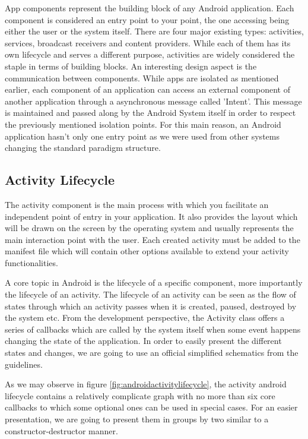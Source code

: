 App components represent the building block of any Android application. Each component is considered an entry point to your point, the one accessing being either the user or the system itself. There are four major existing types: activities, services, broadcast receivers and content providers. While each of them has its own lifecycle
and serves a different purpose, activities are widely considered the staple in terms of building blocks. An interesting design aspect is the communication between components. While apps are isolated as mentioned earlier, each component of an application can access an external component of another application through a asynchronous message called 'Intent'. This message is maintained and passed along by the Android System itself in order to respect the previously mentioned isolation points. For this main reason, an Android application hasn't only one entry point as we were used from other systems changing the standard paradigm structure.

\subsection*{Activity Lifecycle}

The activity component is the main process with which you facilitate an independent point of entry in your application. It also provides the layout which will be drawn on the screen by the operating system and usually represents the main interaction point with the user. Each created activity must be added to the manifest file which will contain other options available to extend your activity functionalities.

A core topic in Android is the lifecycle of a specific component, more importantly the lifecycle of an activity. The lifecycle of an activity can be seen as the flow of states through which an activity passes when it is created, paused, destroyed by the system etc. From the development perspective, the Activity class offers a series of callbacks which are called by the system itself when some event happens changing the state of the application. In order to easily present the different states and changes, we are going to use an official simplified schematics from the guidelines.

As we may observe in figure \ref{fig:androidactivitylifecycle}, the activity android lifecycle contains a relatively complicate graph with no more than six core callbacks to which some optional ones can be used in special cases. For an easier presentation, we are going to present them in groups by two similar to a constructor-destructor manner.


